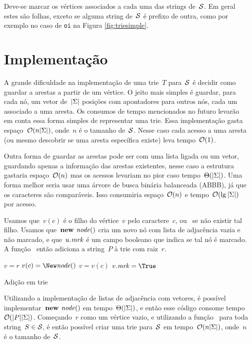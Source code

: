 Deve-se marcar os vértices associados a cada uma das strings de~$\mathcal{S}$. Em geral estes são folhas, exceto se alguma string de~$\mathcal{S}$ é prefixo de outra, como por exemplo no caso de \texttt{oi} na Figura \ref{fig:triesimple}.

\section{Implementação}
\label{sec:trieimpl}

A grande dificuldade na implementação de uma trie~$T$ para~$\mathcal{S}$ é decidir como guardar a arestas a partir de um vértice. O jeito mais simples é guardar, para cada nó, um vetor de~$|\Sigma|$ posições com apontadores para outros nós, cada um associado a uma aresta. Os consumos de tempo mencionados no futuro levarão em conta essa forma simples de representar uma trie. Essa implementação gasta espaço~$\mathcal{O}(n|\Sigma|)$, onde~$n$ é o tamanho de~$\mathcal{S}$. Nesse caso cada acesso a uma aresta (ou mesmo descobrir se uma aresta específica existe) leva tempo~$\mathcal{O}(1)$.

Outra forma de guardar as arestas pode ser com uma lista ligada ou um vetor, guardando apenas a informação das arestas existentes, nesse caso a estrutura gastaria espaço~$\mathcal{O}(n)$ mas os acessos levariam no pior caso tempo~$\Theta(|\Sigma|)$. Uma forma melhor seria usar uma árvore de busca binária balanceada (ABBB), já que os caracteres são comparáveis. Isso consumiria espaço~$\mathcal{O}(n)$ e tempo~$\mathcal{O}(\lg|\Sigma|)$ por acesso.

Usamos que~$v(c)$ é o filho do vértice~$v$ pelo caractere~$c$, ou~ se não existir tal filho. Usamos que~$\textbf{new } \mathit{node}()$ cria um novo nó com lista de adjacência vazia e não marcado, e que~$u.\mathit{mrk}$ é um campo booleano que indica se tal nó é marcado. A função~ então adiciona a string~$P$ à trie com raiz~$r$.

\begin{algorithm}
\begin{algorithmic}[1]
    \State $v = r$
            \State $v(c) = \New \node()$ \label{trie:create}
        \EndIf
        \State $v = v(c)$
    \EndFor
    \State $v.\mrk = \True$
\EndFunction
\end{algorithmic}
\caption{Adição em trie} \label{lst:trie}
\end{algorithm}

Utilizando a implementação de listas de adjacência com vetores, é possível implementar~$\textbf{new } \mathit{node}()$ em tempo~$\Theta(|\Sigma|)$, e então esse código consome tempo~$\mathcal{O}(|P||\Sigma|)$. Começando~$r$ como um vértice vazio, e utilizando a função~ para toda string~$S \in \mathcal{S}$, é então possível criar uma trie para~$\mathcal{S}$ em tempo~$\mathcal{O}(n|\Sigma|)$, onde~$n$ é o tamanho de~$\mathcal{S}$.

